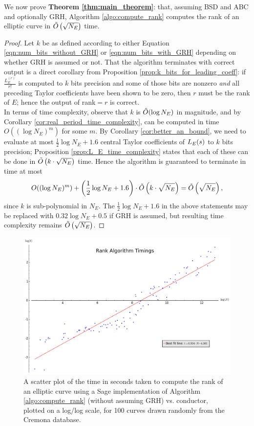 We now prove {\bf Theorem \ref{thm:main_theorem}}: that, assuming BSD and ABC and optionally GRH, Algorithm \ref{algo:compute_rank} computes the rank of an elliptic curve in $\tilde{O}\left(\sqrt{N_E}\right)$ time.
\begin{proof}
Let $k$ be as defined according to either Equation \ref{eqn:num_bits_without_GRH} or \ref{eqn:num_bits_with_GRH} depending on whether GRH is assumed or not. That the algorithm terminates with correct output is a direct corollary from Proposition \ref{prop:k_bits_for_leading_coeff}: if $\frac{L_E^{(r)}}{r!}$ is computed to $k$ bits precision and some of those bits are nonzero {\it and} all preceding Taylor coefficients have been shown to be zero, then $r$ must be the rank of $E$; hence the output of rank$=r$ is correct. \\

In terms of time complexity, observe that $k$ is $\tilde{O}(\log N_E)$ in magnitude, and by Corollary \ref{cor:real_period_time_complexity}, can be computed in time $O((\log N_E)^m)$ for some $m$. By Corollary \ref{cor:better_an_bound}, we need to evaluate at most $\frac{1}{2}\log N_E +1.6$ central Taylor coefficients of $L_E(s)$ to $k$ bits precision; Proposition \ref{prop:L_E_time_complexity} states that each of these can be done in $\tilde{O}\left(k\cdot \sqrt{N_E}\right)$ time. Hence the algorithm is guaranteed to terminate in time at most 
\begin{equation}
O((\log N_E)^m) + \left(\frac{1}{2}\log N_E + 1.6\right) \cdot \tilde{O}\left(k\cdot \sqrt{N_E}\right) = \tilde{O}\left(\sqrt{N_E}\right),
\end{equation}
since $k$ is sub-polynomial in $N_E$. The $\frac{1}{2}\log N_E + 1.6$ in the above statements may be replaced with $0.32\log N_E + 0.5$ if GRH is assumed, but resulting time complexity remains $\tilde{O}\left(\sqrt{N_E}\right)$.
\end{proof}

\begin{figure}[!h]
    \centering
    \includegraphics[width=1.0\textwidth]{graphics/rank_algorithm_timings.png}
    \caption{A scatter plot of the time in seconds taken to compute the rank of an elliptic curve using a Sage implementation of Algorithm \ref{algo:compute_rank} (without assuming GRH) vs. conductor, plotted on a log/log scale, for 100 curves drawn randomly from the Cremona database.}
    \label{fig:rank_algorithm_timings}
\end{figure}

